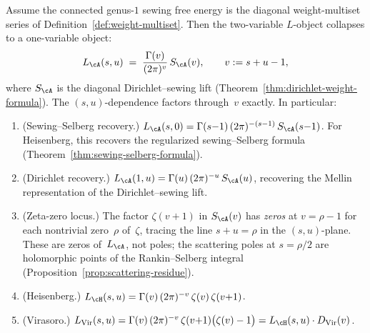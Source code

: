 \begin{theorem}%
\label{thm:sewing-hecke-reciprocity}%
\ClaimStatusConditional%
%
Assume the connected genus-$1$ sewing free energy is the diagonal
weight-multiset series of
Definition~\ref{def:weight-multiset}.  Then the two-variable
$L$-object collapses to a one-variable object:
\begin{equation}\label{eq:sewing-hecke}
L_\cA(s,u)
\;=\;
\frac{\Gamma(v)}{(2\pi)^v}\,S_\cA(v),
\qquad
v := s + u - 1,
\end{equation}
where $S_\cA$ is the diagonal Dirichlet--sewing lift
\textup{(}Theorem~\textup{\ref{thm:dirichlet-weight-formula}}\textup{)}.
The $(s,u)$-dependence factors through~$v$ exactly.
In particular\textup:
\begin{enumerate}[label=\textup{(\roman*)}]
\item
\textup{(}Sewing--Selberg recovery.\textup{)}
$L_\cA(s,0) = \Gamma(s{-}1)\,(2\pi)^{-(s-1)}\,S_\cA(s{-}1)$.
For Heisenberg, this recovers the regularized
sewing--Selberg formula
\textup{(}Theorem~\textup{\ref{thm:sewing-selberg-formula}}\textup{)}.
\item
\textup{(}Dirichlet recovery.\textup{)}
$L_\cA(1,u) = \Gamma(u)\,(2\pi)^{-u}\,S_\cA(u)$,
recovering the Mellin representation of the
Dirichlet--sewing lift.
\item
\textup{(}Zeta-zero locus.\textup{)}
The factor $\zeta(v{+}1)$ in $S_\cA(v)$ has \emph{zeros}
at $v = \rho - 1$ for each nontrivial zero~$\rho$
of~$\zeta$, tracing the line $s + u = \rho$
in the $(s,u)$-plane. These are zeros of~$L_\cA$,
not poles; the scattering poles at $s = \rho/2$ are
holomorphic points of the Rankin--Selberg integral
\textup{(}Proposition~\textup{\ref{prop:scattering-residue}}\textup{)}.
\item
\textup{(}Heisenberg.\textup{)}
$L_\cH(s,u) = \Gamma(v)\,(2\pi)^{-v}\,
\zeta(v)\,\zeta(v{+}1)$.
\item
\textup{(}Virasoro.\textup{)}
$L_{\mathrm{Vir}}(s,u) = \Gamma(v)\,(2\pi)^{-v}\,
\zeta(v{+}1)\bigl(\zeta(v) - 1\bigr)
= L_\cH(s,u)\cdot D_{\mathrm{Vir}}(v)$.
\end{enumerate}
\end{theorem}

